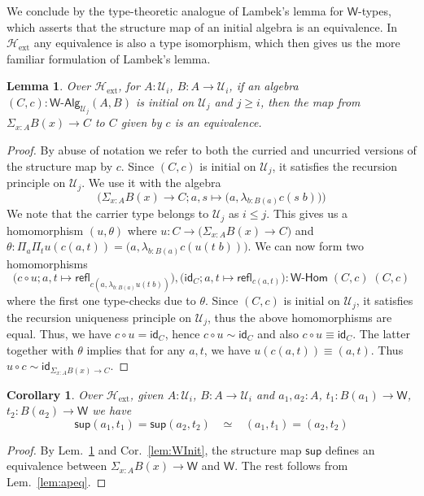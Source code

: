 \documentclass[11pt]{article}
\newcommand{\comp}{\circ}
\newcommand{\idfun}[1]{\mathsf{id}_{#1}}
\newcommand{\prd}[1]{\Pi_{#1}}
\newcommand{\sm}[1]{\Sigma_{#1}}
\newcommand{\lam}[1]{\lambda_{#1}}
\newcommand{\refl}{\mathsf{refl}}
\newcommand{\W}{\mathsf{W}}
\newcommand{\wsup}{\mathsf{sup}}
\newcommand{\UU}{\mathcal{U}}
\newcommand{\WAlg}{\mathsf{W}\text{-}\mathsf{Alg}}
\newcommand{\WHom}{\mathsf{W}\text{-}\mathsf{Hom}}
\newcommand{\Hext}{\mathcal{H}_{\mathrm{ext}}}
\newtheorem{lemma}[theorem]{Lemma}
\newtheorem{corollary}[theorem]{Corollary}
\theoremstyle{definition}
\begin{document}
We conclude by the type-theoretic analogue of Lambek's lemma for $\W$-types, which asserts that the structure map of an initial algebra is an equivalence. In $\Hext$ any equivalence is also a type isomorphism, which then gives us the more familiar formulation of Lambek's lemma.

\begin{lemma}\label{lem:ExtLambek}
Over $\Hext$, for $A:\UU_i$, $B : A \to \UU_i$, if an algebra $(C,c) : \WAlg_{\UU_j}(A,B)$ is initial on $\UU_j$ and $j \geq i$, then the map from $\sm{x:A} B(x) \to C$ to $C$ given by $c$ is an equivalence.
\end{lemma}
\begin{proof}
By abuse of notation we refer to both the curried and uncurried versions of the structure map by $c$. Since $(C,c)$ is initial on $\UU_j$, it satisfies the recursion principle on $\UU_j$. We use it with the algebra \[\Big(\sm{x:A} B(x) \to C; a,s \mapsto \big(a,\lam{b:B(a)} c(s\;b)\big)\Big)\]
We note that the carrier type belongs to $\UU_j$ as $i \leq j$. This gives us a homomorphism $(u,\theta)$ where $u : C \to \big(\sm{x:A} B(x) \to C\big)$ and $\theta : \prd{a}\prd{t} u(c(a,t)) = \big(a,\lam{b:B(a)} c(u(t\;b))\big)$.  We can now form two homomorphisms
\[\big(c \comp u; a,t \mapsto \refl_{c(a,\lam{b:B(a)}u(t\;b))}\big), \big(\idfun{C}; a,t \mapsto \refl_{c(a,t)}\big) : \WHom \; (C,c) \; (C,c)\] where the first one type-checks due to $\theta$. Since $(C,c)$ is initial on $\UU_j$, it satisfies the recursion uniqueness principle on $\UU_j$, thus the above homomorphisms are equal. Thus, we have $c \comp u = \idfun{C}$, hence $c \comp u \sim \idfun{C}$ and also $c \comp u \equiv \idfun{C}$. The latter together with $\theta$ implies that for any $a,t$, we have $u(c(a,t)) \equiv (a,t)$. Thus $u \comp c \sim \idfun{\sm{x:A} B(x) \to C}$.
\end{proof}

\begin{corollary}
Over $\Hext$, given $A:\UU_i$, $B : A \to \UU_i$ and $a_1,a_2:A$, $t_1 : B(a_1) \to \W$, $t_2 : B(a_2) \to \W$ we have
\[ \wsup(a_1,t_1) = \wsup(a_2,t_2) \;\;\; \simeq \;\;\; (a_1,t_1) = (a_2,t_2)\]
\end{corollary}
\begin{proof}
By Lem.~\ref{lem:ExtLambek} and Cor.~\ref{lem:WInit}, the structure map $\wsup$ defines an equivalence between $\sm{x:A} B(x) \to \W$ and $\W$. The rest follows from Lem.~\ref{lem:apeq}.
\end{proof}
\end{document}

